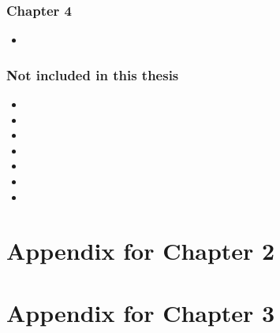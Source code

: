 \documentclass{puthesis}
\begin{document}
\subsection{Chapter 4}
\begin{itemize}
  \item {}
\end{itemize}

\subsection{Not included in this thesis}
\begin{itemize}
\item {} %
\item {} %
\item {} %
\item {} %
\item {} %
\item {} %
\item {} %
\end{itemize}

\chapter{Appendix for Chapter 2}


\chapter{Appendix for Chapter 3}

\end{document}
